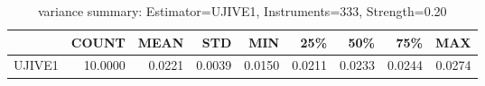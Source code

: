 \begin{table}[ht]
\centering
\caption{variance summary: Estimator=UJIVE1, Instruments=333, Strength=0.20}
\begin{tabular}{lrrrrrrrr}
\toprule
 & COUNT & MEAN & STD & MIN & 25\% & 50\% & 75\% & MAX \\
\midrule
UJIVE1 & 10.0000 & 0.0221 & 0.0039 & 0.0150 & 0.0211 & 0.0233 & 0.0244 & 0.0274 \\
\bottomrule
\end{tabular}
\end{table}
